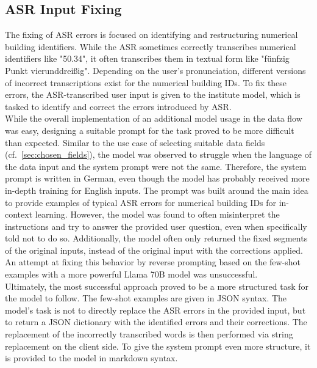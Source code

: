 \documentclass{article}
\begin{document}
\subsection{ASR Input Fixing} \label{sec:asr_fix}
The fixing of ASR errors is focused on identifying and restructuring numerical building identifiers. While the ASR sometimes correctly transcribes numerical identifiers like "50.34", it often transcribes them in textual form like "fünfzig Punkt vierunddreißig". Depending on the user's pronunciation, different versions of incorrect transcriptions exist for the numerical building IDs. To fix these errors, the ASR-transcribed user input is given to the institute model, which is tasked to identify and correct the errors introduced by ASR.\\

While the overall implementation of an additional model usage in the data flow was easy, designing a suitable prompt for the task proved to be more difficult than expected. Similar to the use case of selecting suitable data fields (cf.~\cref{sec:chosen_fields}), the model was observed to struggle when the language of the data input and the system prompt were not the same. Therefore, the system prompt is written in German, even though the model has probably received more in-depth training for English inputs. The prompt was built around the main idea to provide examples of typical ASR errors for numerical building IDs for in-context learning. However, the model was found to often misinterpret the instructions and try to answer the provided user question, even when specifically told not to do so. Additionally, the model often only returned the fixed segments of the original inputs, instead of the original input with the corrections applied. An attempt at fixing this behavior by reverse prompting based on the few-shot examples with a more powerful Llama 70B model was unsuccessful.\\

Ultimately, the most successful approach proved to be a more structured task for the model to follow. The few-shot examples are given in JSON syntax. The model's task is not to directly replace the ASR errors in the provided input, but to return a JSON dictionary with the identified errors and their corrections. The replacement of the incorrectly transcribed words is then performed via string replacement on the client side. To give the system prompt even more structure, it is provided to the model in markdown syntax. \\
\end{document}
